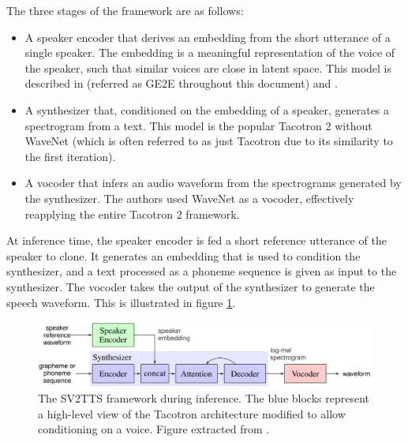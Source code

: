 \documentclass[a4paper, oneside, 12pt, english]{article}
\begin{document}
The three stages of the framework are as follows:
\begin{itemize}
	\item A speaker encoder that derives an embedding from the short utterance of a single speaker. The embedding is a meaningful representation of the voice of the speaker, such that similar voices are close in latent space. This model is described in \citep{GE2E} (referred as GE2E throughout this document) and \citep{TE2E}.
	\item A synthesizer that, conditioned on the embedding of a speaker, generates a spectrogram from a text. This model is the popular Tacotron 2 \citep{Tacotron2} without WaveNet (which is often referred to as just Tacotron due to its similarity to the first iteration).
	\item A vocoder that infers an audio waveform from the spectrograms generated by the synthesizer. The authors used WaveNet \citep{WaveNet} as a vocoder, effectively reapplying the entire Tacotron 2 framework.
\end{itemize}
At inference time, the speaker encoder is fed a short reference utterance of the speaker to clone. It generates an embedding that is used to condition the synthesizer, and a text processed as a phoneme sequence is given as input to the synthesizer. The vocoder takes the output of the synthesizer to generate the speech waveform. This is illustrated in figure \ref{sv2tts_framework}.

\begin{figure}[h]
	\centering
	\includegraphics[width=\linewidth]{images/sv2tts_framework.jpg}
	\caption{The SV2TTS framework during inference. The blue blocks represent a high-level view of the Tacotron architecture modified to allow conditioning on a voice. Figure extracted from \citep{SV2TTS}.}
	\label{sv2tts_framework}
\end{figure}
\end{document}
